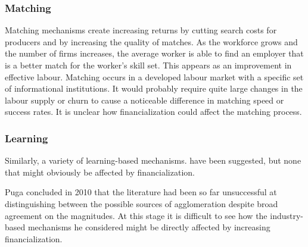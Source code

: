 \subsubsection{Matching}
Matching mechanisms create increasing returns by cutting search costs for producers and by increasing the quality of matches. As the workforce grows and the number of firms increases, the average worker is able to find an employer that is a better match for the worker's skill set. This appears as an improvement in effective labour. Matching occurs in a developed labour market with a specific set of informational institutions. It would probably require  quite large changes in the labour supply or churn to cause a noticeable difference in matching speed or success rates. It is unclear how financialization could affect the matching process.

\subsubsection{Learning}
Similarly, a variety of learning-based mechanisms. have been suggested, but none that might obviously  be affected by financialization. 

Puga \cite{pugaMAGNITUDECAUSESAGGLOMERATION2010} concluded in 2010 that the literature had been so far unsuccessful at distinguishing between the possible sources of agglomeration  despite broad agreement on the magnitudes. 
At this stage it is difficult to see how the industry-based mechanisms he considered might be directly affected by  increasing financialization.




